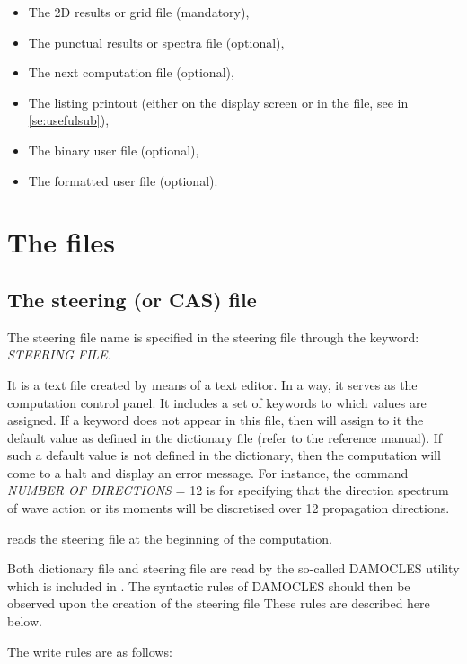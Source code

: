 \begin{itemize}
\item  The 2D results or grid file (mandatory),
\item  The punctual results or spectra file (optional),
\item  The next computation file (optional),
\item  The listing printout (either on the display screen or in the file, see in \ref{se:usefulsub}),
\item  The binary user file (optional),
\item  The formatted user file (optional).
\end{itemize}

\section{ The files}

\subsection{ The steering (or CAS) file}
\label{se:steeringfile}
 The steering file name is specified in the steering file through the keyword: \textit{STEERING FILE.}

 It is a text file created by means of a text editor. In a way, it serves as the computation control panel. It includes a set of keywords to which values are assigned. If a keyword does not appear in this file, then \tomawac will assign to it the default value as defined in the dictionary file (refer to the reference manual). If such a default value is not defined in the dictionary, then the computation will come to a halt and display an error message. For instance, the command \textit{NUMBER OF DIRECTIONS} = 12 is for specifying that the direction spectrum of wave action or its moments will be discretised over 12 propagation directions.

 \tomawac reads the steering file at the beginning of the computation.

 Both dictionary file and steering file are read by the so-called DAMOCLES utility which is included in \tomawac. The syntactic rules of DAMOCLES should then be observed upon the creation of the steering file These rules are described here below.

 The write rules are as follows:

